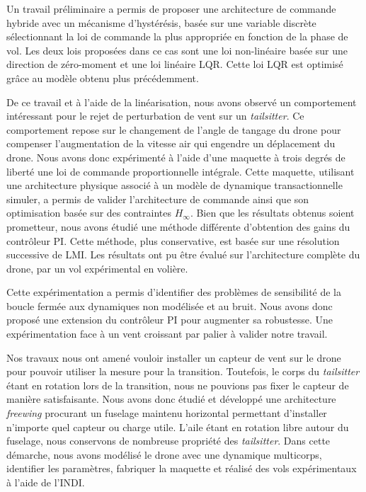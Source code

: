 {Un travail préliminaire a permis de proposer une architecture de commande hybride avec un mécanisme d'hystérésis, basée sur une variable discrète sélectionnant la loi de commande la plus appropriée en fonction de la phase de vol. Les deux lois proposées dans ce cas sont une loi non-linéaire basée sur une direction de zéro-moment et une loi linéaire LQR. Cette loi LQR est optimisé grâce au modèle obtenu plus précédemment.

De ce travail et à l'aide de la linéarisation, nous avons observé un comportement intéressant pour le rejet de perturbation de vent sur un \textit{tailsitter}. Ce comportement repose sur le changement de l'angle de tangage du drone pour compenser l'augmentation de la vitesse air qui engendre un déplacement du drone. Nous avons donc expérimenté à l'aide d'une maquette à trois degrés de liberté une loi de commande proportionnelle intégrale. Cette maquette, utilisant une architecture physique associé à un modèle de dynamique transactionnelle simuler, a permis de valider l'architecture de commande ainsi que son optimisation basée sur des contraintes $H_{\infty}$.
Bien que les résultats obtenus soient prometteur, nous avons étudié une méthode différente d'obtention des gains du contrôleur PI. Cette méthode, plus conservative, est basée sur une résolution successive de LMI. Les résultats ont pu être évalué sur l'architecture complète du drone, par un vol expérimental en volière.

Cette expérimentation a permis d'identifier des problèmes de sensibilité de la boucle fermée aux dynamiques non modélisée et au bruit. Nous avons donc proposé une extension du contrôleur PI pour augmenter sa robustesse. Une expérimentation face à un vent croissant par palier à valider notre travail.

Nos travaux nous ont amené vouloir installer un capteur de vent sur le drone pour pouvoir utiliser la mesure pour la transition. Toutefois, le corps du \textit{tailsitter} étant en rotation lors de la transition, nous ne pouvions pas fixer le capteur de manière satisfaisante. Nous avons donc étudié et développé une architecture \textit{freewing} procurant un fuselage maintenu horizontal permettant d'installer n'importe quel capteur ou charge utile. L'aile étant en rotation libre autour du fuselage, nous conservons de nombreuse propriété des \textit{tailsitter}. Dans cette démarche, nous avons modélisé le drone avec une dynamique multicorps, identifier les paramètres, fabriquer la maquette et réalisé des vols expérimentaux à l'aide de l'INDI.

}
